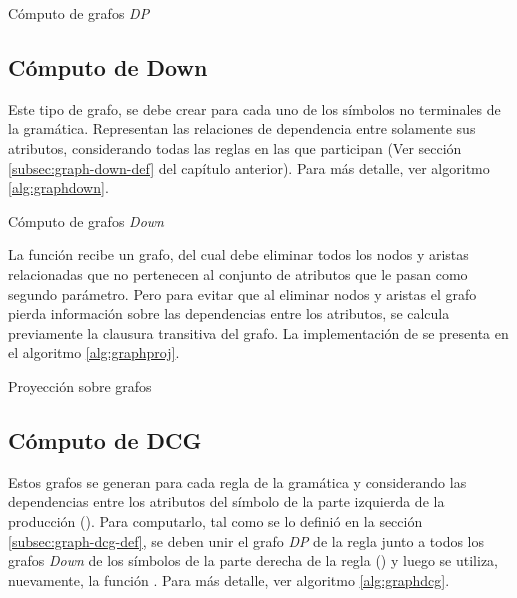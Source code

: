 \begin{algorithm}[!ht]

\caption{\label{alg:graphdp} Cómputo de grafos \textit{DP}}
\end{algorithm}

\subsection{Cómputo de Down}
\label{subsec:alg-DOWN}
Este tipo de grafo, se debe crear para cada uno de los símbolos no terminales de la gramática. Representan las relaciones de dependencia entre solamente sus atributos, considerando todas las reglas en las que participan (Ver sección \ref{subsec:graph-down-def} del capítulo anterior). Para más detalle, ver algoritmo \ref{alg:graphdown}.

\begin{algorithm}[!ht]

\caption{\label{alg:graphdown} Cómputo de grafos \textit{Down}}
\end{algorithm}

La función  recibe un grafo, del cual debe eliminar todos los nodos y aristas relacionadas que no pertenecen al conjunto de atributos que le pasan como segundo parámetro. Pero para evitar que al eliminar nodos y aristas el grafo pierda información sobre las dependencias entre los atributos, se calcula previamente la clausura transitiva del grafo. La implementación de  se presenta en el algoritmo \ref{alg:graphproj}.

\begin{algorithm}[!ht]

\caption{\label{alg:graphproj} Proyección sobre grafos}
\end{algorithm}

\subsection{Cómputo de DCG}
\label{subsec:alg-DCG}
Estos grafos se generan para cada regla de la gramática y considerando las dependencias entre los atributos del símbolo de la parte izquierda de la producción (). Para computarlo, tal como se lo definió en la sección \ref{subsec:graph-dcg-def}, se deben unir el grafo \textit{DP} de la regla junto a todos los grafos \textit{Down} de los símbolos de la parte derecha de la regla () y luego se utiliza, nuevamente, la función . Para más detalle, ver algoritmo \ref{alg:graphdcg}.

